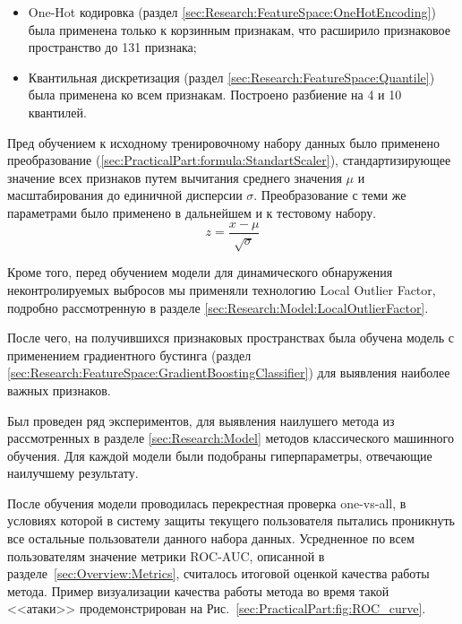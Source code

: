 \documentclass[12pt]{article}
\begin{document}
    \begin{itemize}
        \item One-Hot кодировка (раздел \ref{sec:Research:FeatureSpace:OneHotEncoding}) была применена только к корзинным признакам, что расширило признаковое пространство до 131 признака;
        \item Квантильная дискретизация (раздел \ref{sec:Research:FeatureSpace:Quantile}) была применена ко всем признакам. Построено разбиение на 4 и 10 квантилей.
    \end{itemize}

    \par Пред обучением к исходному тренировочному набору данных было применено преобразование (\ref{sec:PracticalPart:formula:StandartScaler}), стандартизирующее значение всех признаков путем вычитания среднего значения $\mu$ и масштабирования до единичной дисперсии $\sigma$. Преобразование с теми же параметрами было применено в дальнейшем и к тестовому набору.
    \begin{equation}
    \label{sec:PracticalPart:formula:StandartScaler}
        z = \frac{x - \mu}{\sqrt{\sigma}}
    \end{equation}

    \par Кроме того, перед обучением модели для динамического обнаружения неконтролируемых выбросов мы применяли технологию Local Outlier Factor, подробно рассмотренную в разделе \ref{sec:Research:Model:LocalOutlierFactor}.

    \par После чего, на получившихся признаковых пространствах была обучена модель с применением градиентного бустинга (раздел \ref{sec:Research:FeatureSpace:GradientBoostingClassifier}) для выявления наиболее важных признаков.

    \par Был проведен ряд экспериментов, для выявления наилушего метода из рассмотренных в разделе \ref{sec:Research:Model} методов классического машинного обучения. Для каждой модели были подобраны гиперпараметры, отвечающие наилучшему результату.

    \par После обучения модели проводилась перекрестная проверка one-vs-all, в условиях которой в систему защиты текущего пользователя пытались проникнуть все остальные пользователи данного набора данных. Усредненное по всем пользователям значение метрики ROC-AUC, описанной в разделе~\ref{sec:Overview:Metrics}, считалось итоговой оценкой качества работы метода. Пример визуализации качества работы метода во время такой <<атаки>> продемонстрирован на Рис.~\ref{sec:PracticalPart:fig:ROC_curve}.
\end{document}
